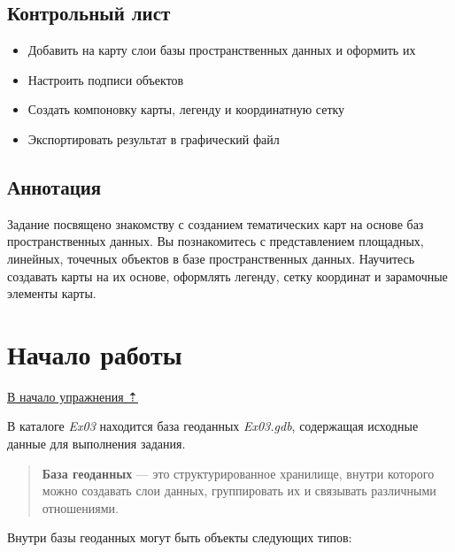 \documentclass[]{book}
\providecommand{\tightlist}{%
  \setlength{\itemsep}{0pt}\setlength{\parskip}{0pt}}
\theoremstyle{definition}
\theoremstyle{definition}
\theoremstyle{definition}
\theoremstyle{remark}
\begin{document}
\hypertarget{map-design-climates-control}{%
\subsection{Контрольный лист}\label{map-design-climates-control}}

\begin{itemize}
\tightlist
\item
  Добавить на карту слои базы пространственных данных и оформить их
\item
  Настроить подписи объектов
\item
  Создать компоновку карты, легенду и координатную сетку
\item
  Экспортировать результат в графический файл
\end{itemize}

\hypertarget{map-design-climates-annotation}{%
\subsection{Аннотация}\label{map-design-climates-annotation}}

Задание посвящено знакомству с созданием тематических карт на основе баз
пространственных данных. Вы познакомитесь с представлением площадных,
линейных, точечных объектов в базе пространственных данных. Научитесь
создавать карты на их основе, оформлять легенду, сетку координат и
зарамочные элементы карты.

\hypertarget{map-design-climates-begin}{%
\section{Начало работы}\label{map-design-climates-begin}}

\protect\hyperlink{map-design-climates}{В начало упражнения ⇡}

В каталоге \emph{Ex03} находится база геоданных \emph{Ex03.gdb},
содержащая исходные данные для выполнения задания.

\begin{quote}
\textbf{База геоданных} --- это структурированное хранилище, внутри
которого можно создавать слои данных, группировать их и связывать
различными отношениями.
\end{quote}

Внутри базы геоданных могут быть объекты следующих типов:
\end{document}
